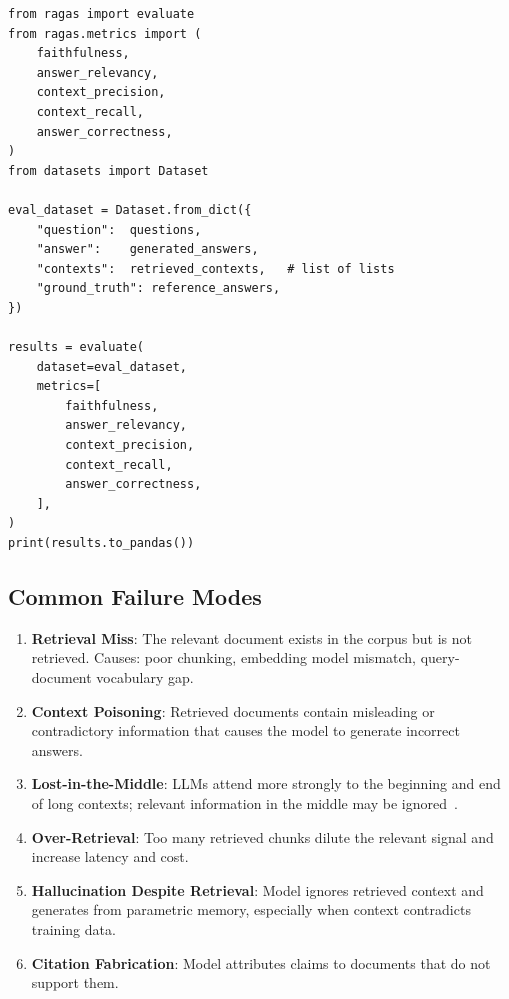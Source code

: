 \begin{lstlisting}[style=pythonstyle, caption={RAGAs evaluation (v0.1 API; v0.2+ uses \texttt{user\_input}, \texttt{response}, \texttt{retrieved\_contexts}, \texttt{reference})}]
from ragas import evaluate
from ragas.metrics import (
    faithfulness,
    answer_relevancy,
    context_precision,
    context_recall,
    answer_correctness,
)
from datasets import Dataset

eval_dataset = Dataset.from_dict({
    "question":  questions,
    "answer":    generated_answers,
    "contexts":  retrieved_contexts,   # list of lists
    "ground_truth": reference_answers,
})

results = evaluate(
    dataset=eval_dataset,
    metrics=[
        faithfulness,
        answer_relevancy,
        context_precision,
        context_recall,
        answer_correctness,
    ],
)
print(results.to_pandas())
\end{lstlisting}

\subsection{Common Failure Modes}
\label{common-failure-modes}

\begin{warningbox}
\begin{enumerate}
  \item \textbf{Retrieval Miss}: The relevant document exists in the corpus but is not retrieved. Causes: poor chunking, embedding model mismatch, query-document vocabulary gap.
  \item \textbf{Context Poisoning}: Retrieved documents contain misleading or contradictory information that causes the model to generate incorrect answers.
  \item \textbf{Lost-in-the-Middle}: LLMs attend more strongly to the beginning and end of long contexts; relevant information in the middle may be ignored~\cite{liu2023lost}.
  \item \textbf{Over-Retrieval}: Too many retrieved chunks dilute the relevant signal and increase latency and cost.
  \item \textbf{Hallucination Despite Retrieval}: Model ignores retrieved context and generates from parametric memory, especially when context contradicts training data.
  \item \textbf{Citation Fabrication}: Model attributes claims to documents that do not support them.
\end{enumerate}
\end{warningbox}

